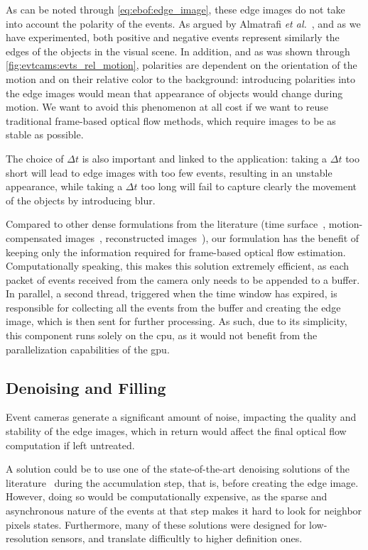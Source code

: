 As can be noted through \cref{eq:ebof:edge_image}, these edge images do not take into account the polarity of the events. As argued by Almatrafi \textit{et al.}~\cite{Almatrafi2020DistanceSF}, and as we have experimented, both positive and negative events represent similarly the edges of the objects in the visual scene. In addition, and as was shown through \cref{fig:evtcams:evts_rel_motion}, polarities are dependent on the orientation of the motion and on their relative color to the background: introducing polarities into the edge images would mean that appearance of objects would change during motion. We want to avoid this phenomenon at all cost if we want to reuse traditional frame-based optical flow methods, which require images to be as stable as possible.

The choice of \(\Delta t\) is also important and linked to the application: taking a \(\Delta t\) too short will lead to edge images with too few events, resulting in an unstable appearance, while taking a \(\Delta t\) too long will fail to capture clearly the movement of the objects by introducing blur.

Compared to other dense formulations from the literature (time surface~\cite{Delbrck2008FramefreeDD,Lagorce2017HOTSAH,Nagata2021OpticalFE}, motion-compensated images~\cite{Gallego2018AUC}, reconstructed images~\cite{Rebecq2021HighSA}), our formulation has the benefit of keeping only the information required for frame-based optical flow estimation. Computationally speaking, this makes this solution extremely efficient, as each packet of events received from the camera only needs to be appended to a buffer. In parallel, a second thread, triggered when the time window has expired, is responsible for collecting all the events from the buffer and creating the edge image, which is then sent for further processing. As such, due to its simplicity, this component runs solely on the \acrshort{cpu}, as it would not benefit from the parallelization capabilities of the \acrshort{gpu}.


\subsection{Denoising and Filling}\label{sec:ebof:denoisingfilling}

Event cameras generate a significant amount of noise, impacting the quality and stability of the edge images, which in return would affect the final optical flow computation if left untreated.

A solution could be to use one of the state-of-the-art denoising solutions of the literature~\cite{Delbrck2008FramefreeDD,Feng2020EventDB} during the accumulation step, that is, before creating the edge image. However, doing so would be computationally expensive, as the sparse and asynchronous nature of the events at that step makes it hard to look for neighbor pixels states. Furthermore, many of these solutions were designed for low-resolution sensors, and translate difficultly to higher definition ones.


